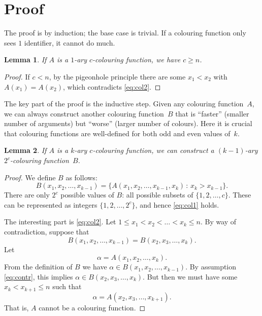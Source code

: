 \documentclass[11pt,a4paper]{article}
\newtheorem{lemma}{Lemma}
\begin{document}
\section{Proof}

The proof is by induction; the base case is trivial. If a colouring function only sees $1$ identifier, it cannot do much.

\begin{lemma}\label{lem:base}
    If $A$ is a $1$-ary $c$-colouring function, we have $c \ge n$.
\end{lemma}
\begin{proof}
    If $c < n$, by the pigeonhole principle there are some $x_1 < x_2$ with $A(x_1) = A(x_2)$, which contradicts \eqref{eq:col2}.
\end{proof}

The key part of the proof is the inductive step. Given any colouring function~$A$, we can always construct another colouring function~$B$ that is ``faster'' (smaller number of arguments) but ``worse'' (larger number of colours). Here it is crucial that colouring functions are well-defined for both odd and even values of~$k$.

\begin{lemma}\label{lem:ind}
    If $A$ is a $k$-ary $c$-colouring function, we can construct a $(k-1)$-ary $2^c$-colouring function~$B$.
\end{lemma}
\begin{proof}
    We define $B$ as follows:
    \[
        B(x_1, x_2, \dotsc, x_{k-1}) = \bigl\{ A(x_1, x_2, \dotsc, x_{k-1}, x_k) \,:\, x_k > x_{k-1} \bigr\}.
    \]
    There are only $2^c$ possible values of $B$: all possible subsets of $\{1,2,\dotsc,c\}$. These can be represented as integers $\{1,2,\dotsc,2^c\}$, and hence \eqref{eq:col1} holds.

    The interesting part is \eqref{eq:col2}. Let $1 \le x_1 < x_2 < \dotso < x_k \le n$. By way of contradiction, suppose that
    \begin{equation}
        B(x_1, x_2, \dotsc, x_{k-1}) = B(x_2, x_3, \dotsc, x_k). \label{eq:contr}
    \end{equation}
    Let
    \[
        \alpha = A(x_1, x_2, \dotsc, x_k).
    \]
    From the definition of $B$ we have
    $\alpha \in B(x_1, x_2, \dotsc, x_{k-1})$.
    By assumption \eqref{eq:contr}, this implies
    $\alpha \in B(x_2, x_3, \dotsc, x_k)$.
    But then we must have some $x_k < x_{k+1} \le n$ such that
    \[
        \alpha = A(x_2, x_3, \dotsc, x_{k+1}).
    \]
    That is, $A$ cannot be a colouring function.
\end{proof}
\end{document}
